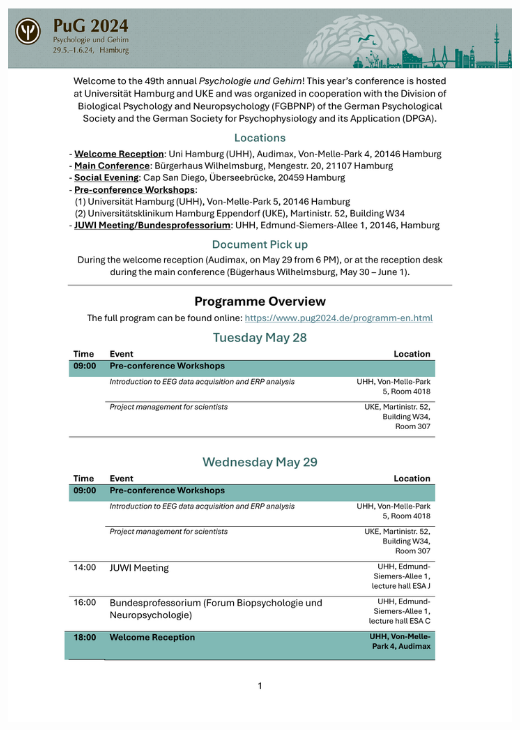 	
	\begin{center}
		\includegraphics[width=1\textwidth]{tex/images/programme_overview/Tue_Wed.pdf}
	\end{center}
		
	\newpage

